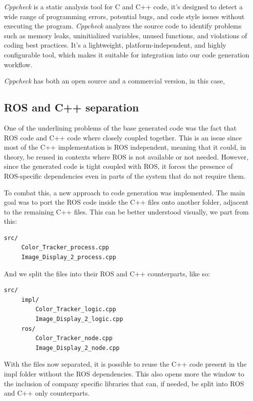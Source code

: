 \textit{Cppcheck} is a static analysis tool for C and C++ code, it's designed to detect a wide range of programming errors, potential bugs, and code style issues without executing the program. \textit{Cppcheck} analyzes the source code to identify problems such as memory leaks, uninitialized variables, unused functions, and violations of coding best practices. It's a lightweight, platform-independent, and highly configurable tool, which makes it suitable for integration into our code generation workflow.

\textit{Cppcheck} has both an open source and a commercial version, in this case, 

\subsection{ROS and C++ separation}
\label{sec:impl_ros_separation}

One of the underlining problems of the base generated code was the fact that \gls{ROS} code and C++ code where closely coupled together. This is an issue since most of the C++ implementation is \gls{ROS} independent, meaning that it could, in theory, be reused in contexts where \gls{ROS} is not available or not needed. However, since the generated code is tight coupled with \gls{ROS}, it forces the presence of ROS-specific dependencies even in parts of the system that do not require them. 

To combat this, a new approach to code generation was implemented. The main goal was to port the \gls{ROS} code inside the C++ files onto another folder, adjacent to the remaining C++ files. This can be better understood visually, we part from this:

\begin{verbatim}
src/
	 Color_Tracker_process.cpp
	 Image_Display_2_process.cpp
\end{verbatim}


And we split the files into their \gls{ROS} and C++ counterparts, like so:

\begin{verbatim}
src/
	 impl/
		 Color_Tracker_logic.cpp
		 Image_Display_2_logic.cpp
	 ros/
		 Color_Tracker_node.cpp
		 Image_Display_2_node.cpp
\end{verbatim}

With the files now separated, it is possible to reuse the C++ code present in the impl folder without the \gls{ROS} dependencies. This also opens more the window to the inclusion of company specific libraries that can, if needed, be split into \gls{ROS} and C++ only counterparts.

